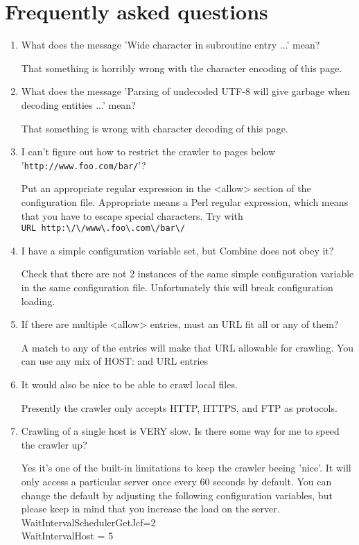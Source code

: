 \section{Frequently asked questions}
\label{faq}
\begin{enumerate}
\item What does the message 'Wide character in subroutine entry ...' mean?

That something is horribly wrong with the character encoding of this page.

\item What does the message 'Parsing of undecoded UTF-8 will give garbage when decoding entities ...' mean?

That something is wrong with character decoding of this page.

\item I can't figure out how to restrict the crawler to pages below
'{\tt http://www.foo.com/bar/}'?

 Put an
appropriate regular expression in the <allow> section of the configuration
file. Appropriate means
a Perl regular expression, which means that you have to escape special
characters. Try with\\
\verb+URL http:\/\/www\.foo\.com\/bar\/+


\item I have a simple configuration variable set, but Combine does not obey it?

Check that there are not 2 instances of the same simple configuration
variable in the same configuration file. Unfortunately this will break
configuration loading.


\item If there are multiple <allow> entries, must an
URL fit all or any of them?

A match to any of the entries will make that URL allowable for crawling.
You can use any mix of HOST: and URL entries

\item It would also be nice to be able to crawl local files.

Presently the crawler only accepts HTTP, HTTPS, and FTP as protocols.

\item \label{slowcrawl}
Crawling of a single host is VERY slow.
Is there some way for me to speed the crawler up?


Yes it's one of the built-in limitations to keep the crawler beeing 'nice'.
It will only access a particular server once every 60 seconds by default.
You can change the default by adjusting the following configuration variables,
but please keep in mind that you increase the load on the server.\\
WaitIntervalSchedulerGetJcf=2\\
WaitIntervalHost = 5\\



\end{enumerate}
